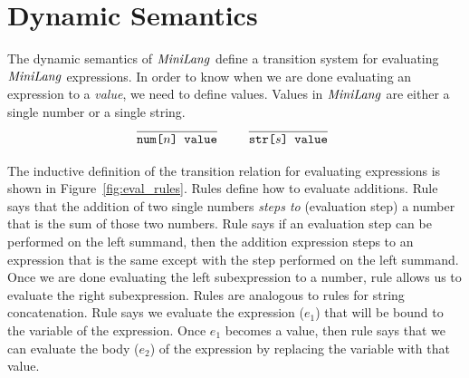\section{Dynamic Semantics}
\label{sec:dynamic}
The dynamic semantics of $\mathit{MiniLang}$ define a transition
system for evaluating $\mathit{MiniLang}$ expressions.
In order to know when we are done evaluating an expression
to a \emph{value}, we need to define values.
Values in $\mathit{MiniLang}$ are either a single number or a
single string.
\[
\cinfer{num[$n$] value}{ }
\qquad
\cinfer{str[$s$] value}{ }
\]


The inductive definition of the transition relation for
evaluating expressions is shown in Figure~\ref{fig:eval_rules}.
Rules  define how to evaluate additions.
Rule  says that the addition of two single
numbers \emph{steps to} (evaluation step) a number that is the
sum of those two numbers.
Rule  says if an evaluation step can be performed
on the left summand, then the addition expression steps to
an expression that is the same except with the step performed
on the left summand.
Once we are done evaluating the left subexpression to a number,
rule  allows us to evaluate the right subexpression.
Rules  are analogous to rules 
for string concatenation.
Rule  says we evaluate the expression ($e_1$) that
will be bound to the variable of the  expression.
Once $e_1$ becomes a value, then rule  says that
we can evaluate the body ($e_2$) of the  expression
by replacing the variable with that value.



